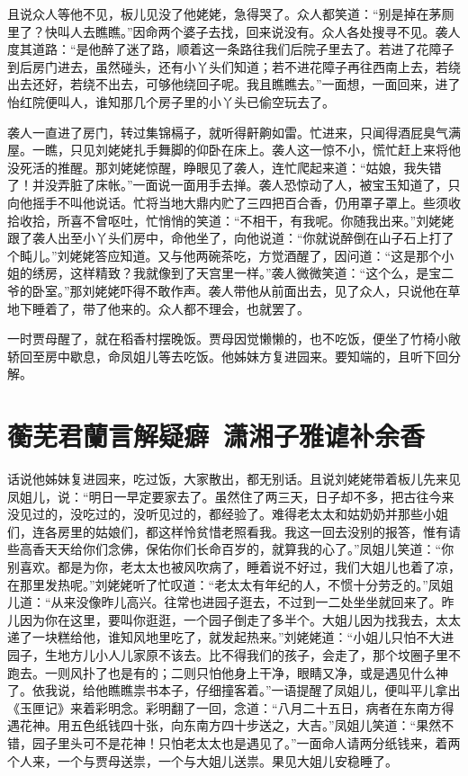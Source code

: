 \documentclass[12pt,oneside]{book}
\begin{document}
且说众人等他不见，板儿见没了他姥姥，急得哭了。众人都笑道：“别是掉在茅厕里了？快叫人去瞧瞧。”因命两个婆子去找，回来说没有。众人各处搜寻不见。袭人度其道路：“是他醉了迷了路，顺着这一条路往我们后院子里去了。若进了花障子到后房门进去，虽然碰头，还有小丫头们知道；若不进花障子再往西南上去，若绕出去还好，若绕不出去，可够他绕回子呢。我且瞧瞧去。”一面想，一面回来，进了怡红院便叫人，谁知那几个房子里的小丫头已偷空玩去了。

袭人一直进了房门，转过集锦槅子，就听得鼾齁如雷。忙进来，只闻得酒屁臭气满屋。一瞧，只见刘姥姥扎手舞脚的仰卧在床上。袭人这一惊不小，慌忙赶上来将他没死活的推醒。那刘姥姥惊醒，睁眼见了袭人，连忙爬起来道：“姑娘，我失错了！并没弄脏了床帐。”一面说一面用手去掸。袭人恐惊动了人，被宝玉知道了，只向他摇手不叫他说话。忙将当地大鼎内贮了三四把百合香，仍用罩子罩上。些须收拾收拾，所喜不曾呕吐，忙悄悄的笑道：“不相干，有我呢。你随我出来。”刘姥姥跟了袭人出至小丫头们房中，命他坐了，向他说道：“你就说醉倒在山子石上打了个盹儿。”刘姥姥答应知道。又与他两碗茶吃，方觉酒醒了，因问道：“这是那个小姐的绣房，这样精致？我就像到了天宫里一样。”袭人微微笑道：“这个么，是宝二爷的卧室。”那刘姥姥吓得不敢作声。袭人带他从前面出去，见了众人，只说他在草地下睡着了，带了他来的。众人都不理会，也就罢了。

一时贾母醒了，就在稻香村摆晚饭。贾母因觉懒懒的，也不吃饭，便坐了竹椅小敞轿回至房中歇息，命凤姐儿等去吃饭。他姊妹方复进园来。要知端的，且听下回分解。

 
\chapter{蘅芜君蘭言解疑癖~潇湘子雅谑补余香}
话说他姊妹复进园来，吃过饭，大家散出，都无别话。且说刘姥姥带着板儿先来见凤姐儿，说：“明日一早定要家去了。虽然住了两三天，日子却不多，把古往今来没见过的，没吃过的，没听见过的，都经验了。难得老太太和姑奶奶并那些小姐们，连各房里的姑娘们，都这样怜贫惜老照看我。我这一回去没别的报答，惟有请些高香天天给你们念佛，保佑你们长命百岁的，就算我的心了。”凤姐儿笑道：“你别喜欢。都是为你，老太太也被风吹病了，睡着说不好过，我们大姐儿也着了凉，在那里发热呢。”刘姥姥听了忙叹道：“老太太有年纪的人，不惯十分劳乏的。”凤姐儿道：“从来没像昨儿高兴。往常也进园子逛去，不过到一二处坐坐就回来了。昨儿因为你在这里，要叫你逛逛，一个园子倒走了多半个。大姐儿因为找我去，太太递了一块糕给他，谁知风地里吃了，就发起热来。”刘姥姥道：“小姐儿只怕不大进园子，生地方儿小人儿家原不该去。比不得我们的孩子，会走了，那个坟圈子里不跑去。一则风扑了也是有的；二则只怕他身上干净，眼睛又净，或是遇见什么神了。依我说，给他瞧瞧祟书本子，仔细撞客着。”一语提醒了凤姐儿，便叫平儿拿出《玉匣记》来着彩明念。彩明翻了一回，念道：“八月二十五日，病者在东南方得遇花神。用五色纸钱四十张，向东南方四十步送之，大吉。”凤姐儿笑道：“果然不错，园子里头可不是花神！只怕老太太也是遇见了。”一面命人请两分纸钱来，着两个人来，一个与贾母送祟，一个与大姐儿送祟。果见大姐儿安稳睡了。
\end{document}
